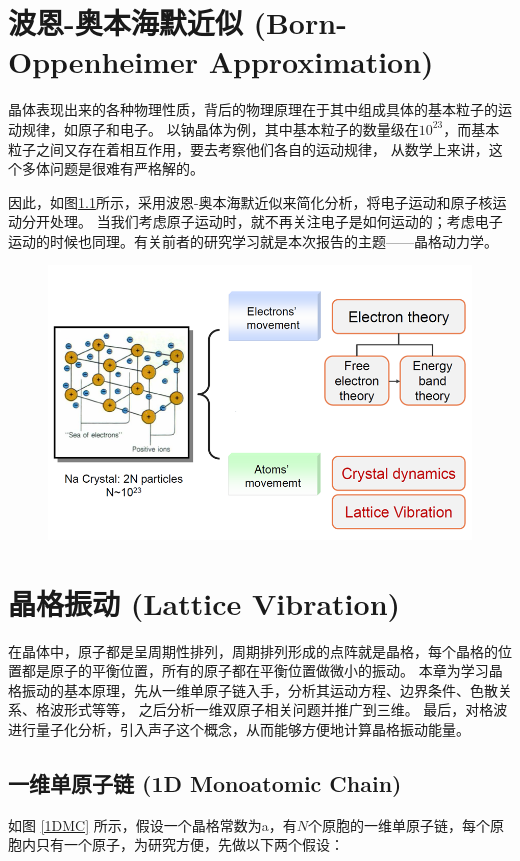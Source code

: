 \documentclass[declarePage]{ecnuthesis}
\begin{document}
\chapter{波恩-奥本海默近似 (Born-Oppenheimer Approximation)}

晶体表现出来的各种物理性质，背后的物理原理在于其中组成具体的基本粒子的运动规律，如原子和电子。%
以钠晶体为例，其中基本粒子的数量级在$10^{23}$，而基本粒子之间又存在着相互作用，要去考察他们各自的运动规律，%
从数学上来讲，这个多体问题是很难有严格解的。

因此，如图\ref{BOA}所示，采用波恩-奥本海默近似来简化分析，将电子运动和原子核运动分开处理。%
当我们考虑原子运动时，就不再关注电子是如何运动的；考虑电子运动的时候也同理。有关前者的研究学习就是本次报告的主题——晶格动力学。
\begin{figure}[htb]
    \centering
    \includegraphics[width=.7\textwidth]{BOA.png}
    \label{BOA}
\end{figure}

\chapter{晶格振动 (Lattice Vibration)}

在晶体中，原子都是呈周期性排列，周期排列形成的点阵就是晶格，每个晶格的位置都是原子的平衡位置，所有的原子都在平衡位置做微小的振动。%
本章为学习晶格振动的基本原理，先从一维单原子链入手，分析其运动方程、边界条件、色散关系、格波形式等等，%
之后分析一维双原子相关问题并推广到三维。%
最后，对格波进行量子化分析，引入声子这个概念，从而能够方便地计算晶格振动能量。

\section{一维单原子链 (1D Monoatomic Chain)}

如图 \ref{1DMC} 所示，假设一个晶格常数为a，有$N$个原胞的一维单原子链，每个原胞内只有一个原子，为研究方便，先做以下两个假设：
\end{document}
